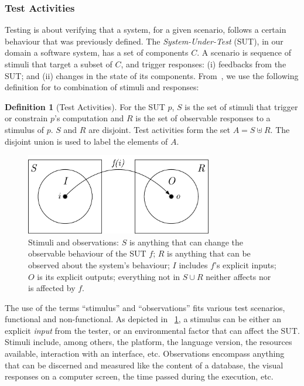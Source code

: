 \documentclass[a4paper,11pt]{sdm_internship}
\theoremstyle{definition}
\newtheorem{definition}{Definition}[section]
\begin{document}
\subsubsection{Test Activities}%
\label{sssec:test_activities}
Testing is about verifying that a system, for a given scenario, follows a certain behaviour that was previously defined.
The \emph{System-Under-Test} (SUT), in our domain a software system, has a set of components $C$.
A scenario is sequence of stimuli that target a subset of $C$, and trigger responses: (i) feedbacks from the SUT\@; and (ii) changes in the state of its components.
From~\cite{barr2015oracle}, we use the following definition for to combination of stimuli and responses:

\begin{definition}[Test Activities]
  For the SUT $p$, $S$ is the set of stimuli that trigger or constrain $p$'s computation and $R$ is the set of observable responses to a stimulus of $p$.
  $S$ and $R$ are disjoint.
  Test activities form the set $A = S\uplus{}R$.
  The disjoint union is used to label the elements of $A$.
\end{definition}

\begin{figure}
  \centering
  \includegraphics[width=22em]{stim_and_obs}
  \caption{Stimuli and observations: $S$ is anything that can change the observable behaviour of the SUT $f$; $R$ is anything that can be observed about the system's behaviour; $I$ includes $f$'s explicit inputs; $O$ is its explicit outputs; everything not in $S \cup R$ neither affects nor is affected by $f$.}%
  \label{fig:test_activity}
\end{figure}

The use of the terms ``stimulus'' and ``observations'' fits various test scenarios, functional and non-functional.
As depicted in \figurename~\ref{fig:test_activity}, a stimulus can be either an explicit \emph{input} from the tester, or an environmental factor that can affect the SUT\@.
Stimuli include, among others, the platform, the language version, the resources available, interaction with an interface, etc.
Observations encompass anything that can be discerned and measured like the content of a database, the visual responses on a computer screen, the time passed during the execution, etc.
\end{document}

